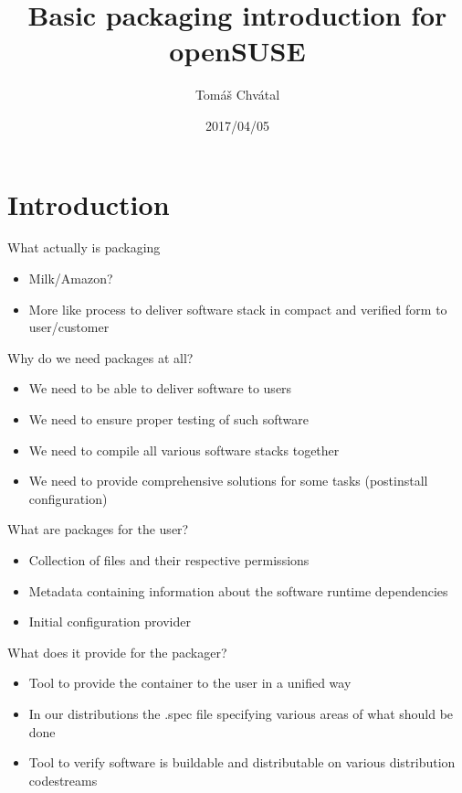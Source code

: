 \documentclass{beamer}
\author{Tom\'{a}\v{s} Chv\'{a}tal\newline {\small tchvatal@suse.com}\newline {\small Packaging/L3 - Packaging}}
\title{Basic packaging introduction for openSUSE}
\date{2017/04/05}
\begin{document}
\begin{frame}[t,plain]
\titlepage
\end{frame}

\section{Introduction}

\begin{frame}[t]{What actually is packaging}
	\begin{itemize}
	\item Milk/Amazon?
	\item More like process to deliver software stack in compact and verified form to user/customer
	\end{itemize}
\end{frame}

\begin{frame}[t]{Why do we need packages at all?}
	\begin{itemize}
	\item We need to be able to deliver software to users
	\item We need to ensure proper testing of such software
	\item We need to compile all various software stacks together
	\item We need to provide comprehensive solutions for some tasks (postinstall configuration)
	\end{itemize}
\end{frame}

\begin{frame}[t]{What are packages for the user?}
	\begin{itemize}
	\item Collection of files and their respective permissions
	\item Metadata containing information about the software runtime dependencies
	\item Initial configuration provider
	\end{itemize}
\end{frame}


\begin{frame}[t]{What does it provide for the packager?}
	\begin{itemize}
	\item Tool to provide the container to the user in a unified way
	\item In our distributions the .spec file specifying various areas of what should be done
	\item Tool to verify software is buildable and distributable on various distribution codestreams
	\end{itemize}
\end{frame}
\end{document}
